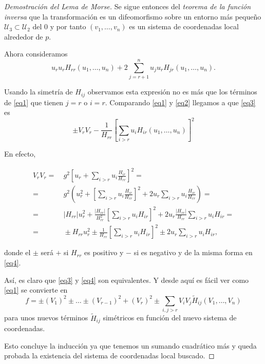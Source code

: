 \begin{proof}[Demostración del Lema de Morse]
    Se sigue entonces del \textit{teorema de la función inversa} que la transformación es un difeomorfismo sobre un entorno más pequeño $\mathcal{U}_3\subset \mathcal{U}_2$ del $0$ y por tanto $(v_1,\dots, v_n)$ es un sistema de coordenadas local alrededor de $p$.

    \bigskip

    Ahora consideramos
    \begin{equation}
        u_ru_rH_{rr}(u_1,\dots, u_n) + 2\sum_{j=r+1}^n u_ju_rH_{jr}(u_1,\dots, u_n).
    \label{eq3}
    \end{equation}

    Usando la simetría de $H_{ij}$ observamos esta expresión no es más que los términos de \eqref{eq1} que tienen $j=r$ o $i=r$. Comparando \eqref{eq1} y \eqref{eq2} llegamos a que \eqref{eq3} es
    \begin{equation}
        \pm V_rV_r - \frac{1}{H_{rr}}\left[ \sum_{i>r} u_iH_{ir}(u_1,\dots, u_n) \right]^2
    \label{eq4}
    \end{equation}

    En efecto,

    \begin{align*}
        V_rV_r =& ~ g^2 \left[u_r+\sum_{i>r}u_i\frac{H_{ir}}{H_{rr}}\right]^2 =\\
        =& ~ g^2 \left( u_r^2 + \left[ \sum_{i>r}u_i\frac{H_{ir}}{H_{rr}}\right]^2 + 2u_r\sum_{i>r}u_i\frac{H_{ir}}{H_{rr}} \right) = \\
        =& ~ |H_{rr}| u_r^2 + \frac{|H_{rr}|}{H_{rr}^2} \left[\sum_{i>r}u_iH_{ir}\right]^2 + 2u_r\frac{|H_{rr}|}{H_{rr}}\sum_{i>r}u_iH_{ir} = \\
        =& ~ \pm H_{rr}u_r^2 \pm \frac{1}{H_{rr}}\left[\sum_{i>r}u_iH_{ir}\right]^2 \pm 2u_r\sum_{i>r}u_iH_{ir},
    \end{align*}

    \vspace{2em}

    donde el $\pm$ será $+$ si $H_{rr}$ es positivo y $-$ si es negativo y de la misma forma en \eqref{eq4}.
    \bigskip
    
    Así, es claro que \eqref{eq3} y \eqref{eq4} son equivalentes. Y desde aquí es fácil ver como \eqref{eq1} se convierte en 
    \begin{equation*}
        f = \pm (V_1)^2 \pm\dots\pm (V_{r-1})^2 + (V_r)^2  \pm \sum_{i,j > r} V_iV_j\tilde{H}_{ij}(V_1,\dots,V_n)
    \end{equation*}
    para unos nuevos términos $\tilde{H}_{ij}$ simétricos en función del nuevo sistema de coordenadas.

    Esto concluye la inducción ya que tenemos un sumando cuadrático más y queda probada la existencia del sistema de coordenadas local buscado.
    
\end{proof}

